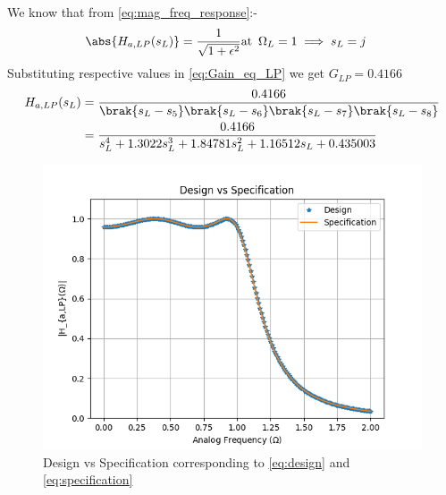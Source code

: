 \documentclass{article}
\begin{document}
\begin{enumerate}
We know that from \eqref{eq:mag_freq_response}:-
\begin{align}
    \abs{ H_{a,LP}(s_L)} &= \frac{1}{\sqrt{1+\epsilon^2}} \text{at} \hspace{5pt} \Omega_{L}=1 \implies s_{L} = j \label{eq:Gain_eq_LP} 
\end{align}
Substituting respective values in \eqref{eq:Gain_eq_LP} we get $G_{LP}=0.4166$
\begin{align}
     H_{a,LP}(s_L) &= \frac{0.4166}{\brak{s_L-s_5}\brak{s_L-s_6}\brak{s_L-s_7}\brak{s_L-s_8}}\\
     &= \frac{0.4166}{s_{L}^4 + 1.3022s_{L}^3 +1.84781s_{L}^2 + 1.16512s_{L} +0.435003}\label{eq:design}
\end{align}
\begin{figure}[H]
\centering
\includegraphics[width=1\columnwidth]{figs/Design_vs_Specification.png}
\caption{Design vs Specification corresponding to \eqref{eq:design} and \eqref{eq:specification}}
\label{fig:design_vs_specf}
\end{figure}


\end{enumerate}
\end{document}
